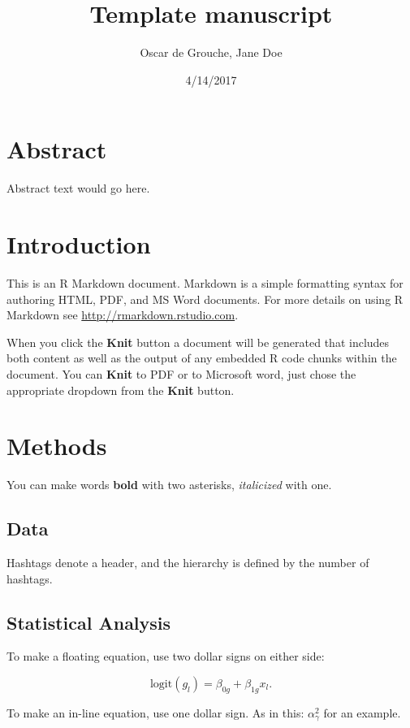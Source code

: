 \documentclass[]{article}
\title{Template manuscript}
\author{Oscar de Grouche, Jane Doe}
\date{4/14/2017}
\begin{document}
\maketitle

\section{Abstract}\label{abstract}

Abstract text would go here.

\section{Introduction}\label{introduction}

This is an R Markdown document. Markdown is a simple formatting syntax
for authoring HTML, PDF, and MS Word documents. For more details on
using R Markdown see \url{http://rmarkdown.rstudio.com}.

When you click the \textbf{Knit} button a document will be generated
that includes both content as well as the output of any embedded R code
chunks within the document. You can \textbf{Knit} to PDF or to Microsoft
word, just chose the appropriate dropdown from the \textbf{Knit} button.

\section{Methods}\label{methods}

You can make words \textbf{bold} with two asterisks, \emph{italicized}
with one.

\subsection{Data}\label{data}

Hashtags denote a header, and the hierarchy is defined by the number of
hashtags.

\subsection{Statistical Analysis}\label{statistical-analysis}

To make a floating equation, use two dollar signs on either side:

\[
\text{logit}(g_l) = \beta_{0g} + \beta_{1g}x_l.
\]

To make an in-line equation, use one dollar sign. As in this:
\(\alpha_\gamma^2\) for an example.
\end{document}
